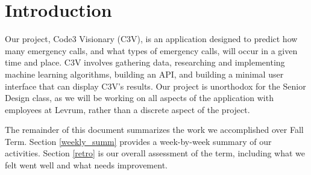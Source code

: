 \documentclass[onecolumn, draftclsnofoot,10pt, compsoc]{IEEEtran}
\begin{document}
\section{Introduction}
\begin{singlespace}
Our project, Code3 Visionary (C3V), is an application designed to predict how many emergency calls, and what types of emergency calls, will occur in a given time and place. 
C3V involves gathering data, researching and implementing machine learning algorithms, building an API, and building a minimal user interface that can display C3V's results. 
Our project is unorthodox for the Senior Design class, as we will be working on all aspects of the application with employees at Levrum, rather than a discrete aspect of the project. 

The remainder of this document summarizes the work we accomplished over Fall Term. 
Section \ref{weekly_summ} provides a week-by-week summary of our activities. 
Section \ref{retro} is our overall assessment of the term, including what we felt went well and what needs improvement.

\end{singlespace}
\end{document}
